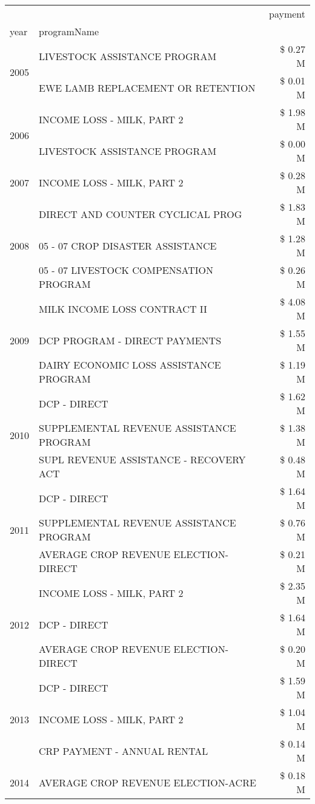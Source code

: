 \begin{tabular}{llr}
\toprule
 &  & payment \\
year & programName &  \\
\midrule
\multirow[t]{2}{*}{2005} & LIVESTOCK ASSISTANCE PROGRAM & \$ 0.27 M \\
 & EWE LAMB REPLACEMENT OR RETENTION & \$ 0.01 M \\
\cline{1-3}
\multirow[t]{2}{*}{2006} & INCOME LOSS - MILK, PART 2 & \$ 1.98 M \\
 & LIVESTOCK ASSISTANCE PROGRAM & \$ 0.00 M \\
\cline{1-3}
2007 & INCOME LOSS - MILK, PART 2 & \$ 0.28 M \\
\cline{1-3}
\multirow[t]{3}{*}{2008} & DIRECT AND COUNTER CYCLICAL PROG & \$ 1.83 M \\
 & 05 - 07 CROP DISASTER ASSISTANCE & \$ 1.28 M \\
 & 05 - 07 LIVESTOCK COMPENSATION PROGRAM & \$ 0.26 M \\
\cline{1-3}
\multirow[t]{3}{*}{2009} & MILK INCOME LOSS CONTRACT II & \$ 4.08 M \\
 & DCP PROGRAM - DIRECT PAYMENTS & \$ 1.55 M \\
 & DAIRY ECONOMIC LOSS ASSISTANCE PROGRAM & \$ 1.19 M \\
\cline{1-3}
\multirow[t]{3}{*}{2010} & DCP - DIRECT & \$ 1.62 M \\
 & SUPPLEMENTAL REVENUE ASSISTANCE PROGRAM & \$ 1.38 M \\
 & SUPL REVENUE ASSISTANCE - RECOVERY ACT & \$ 0.48 M \\
\cline{1-3}
\multirow[t]{3}{*}{2011} & DCP - DIRECT & \$ 1.64 M \\
 & SUPPLEMENTAL REVENUE ASSISTANCE PROGRAM & \$ 0.76 M \\
 & AVERAGE CROP REVENUE ELECTION-DIRECT & \$ 0.21 M \\
\cline{1-3}
\multirow[t]{3}{*}{2012} & INCOME LOSS - MILK, PART 2 & \$ 2.35 M \\
 & DCP - DIRECT & \$ 1.64 M \\
 & AVERAGE CROP REVENUE ELECTION-DIRECT & \$ 0.20 M \\
\cline{1-3}
\multirow[t]{3}{*}{2013} & DCP - DIRECT & \$ 1.59 M \\
 & INCOME LOSS - MILK, PART 2 & \$ 1.04 M \\
 & CRP PAYMENT - ANNUAL RENTAL & \$ 0.14 M \\
\cline{1-3}
\multirow[t]{3}{*}{2014} & AVERAGE CROP REVENUE ELECTION-ACRE & \$ 0.18 M \\

\end{tabular}
